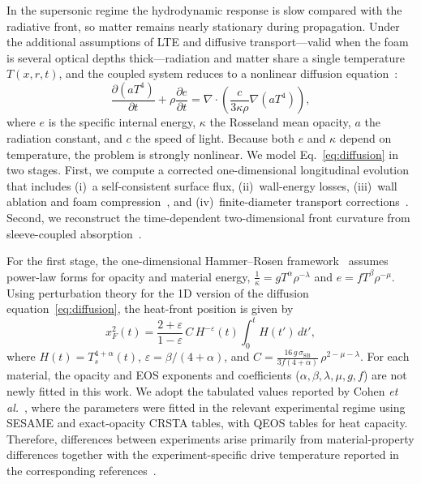 \documentclass[prl, twocolumn, superscriptaddress, amsmath, amssymb, reprint]{revtex4-2}
\begin{document}
In the supersonic regime the hydrodynamic response is slow compared with the radiative front, so matter remains nearly stationary during propagation. Under the additional assumptions of LTE and diffusive transport---valid when the foam is several optical depths thick---radiation and matter share a single temperature $T(x,r,t)$, and the coupled system reduces to a nonlinear diffusion equation~\cite{Pomraning1979,Rosen2009}:
\begin{equation}\label{eq:diffusion}
\frac{\partial (aT^4)}{\partial t} + \rho\frac{\partial e}{\partial t}
= \nabla\!\cdot\!\left(\frac{c}{3\kappa \rho}\nabla\left(aT^4\right)\right),
\end{equation}
where $e$ is the specific internal energy, $\kappa$ the Rosseland mean opacity, $a$ the radiation constant, and $c$ the speed of light. Because both $e$ and $\kappa$ depend on temperature, the problem is strongly nonlinear. We model Eq.~\eqref{eq:diffusion} in two stages. First, we compute a corrected one-dimensional longitudinal evolution that includes (i)~a self-consistent surface flux, (ii)~wall-energy losses, (iii)~wall ablation and foam compression~\cite{Cohen2020Key,Cohen2018}, and (iv)~finite-diameter transport corrections~\cite{Courtois2024}. Second, we reconstruct the time-dependent two-dimensional front curvature from sleeve-coupled absorption~\cite{Hurricane2006,Courtois2022}.

For the first stage, the one-dimensional Hammer--Rosen framework~\cite{Hammer2003,Rosen2009} assumes power-law forms for opacity and material energy,
$\frac{1}{\kappa}=gT^{\alpha}\rho^{-\lambda}$ and $e=fT^{\beta}\rho^{-\mu}$. Using perturbation theory for the 1D version of the diffusion equation~\eqref{eq:diffusion}, the heat-front position is given by
\begin{equation}\label{eq:HR}
    x_F^2(t) = \frac{2+\varepsilon}{1-\varepsilon}\,C\,H^{-\varepsilon}(t)\int_0^t H(t')\,dt',
\end{equation}
where $H(t) = T_s^{4+\alpha}(t)$, $\varepsilon = \beta/(4+\alpha)$, and
	$C = \frac{16\,g\,\sigma_{\mathrm{SB}}}{3f(4+\alpha)}\,\rho^{2-\mu-\lambda}$.
For each material, the opacity and EOS exponents and coefficients ($\alpha,\beta,\lambda,\mu,g,f$) are not newly fitted in this work. We adopt the tabulated values reported by Cohen \textit{et al.}~\cite{Cohen2020Key}, where the parameters were fitted in the relevant experimental regime using SESAME and exact-opacity CRSTA tables, with QEOS tables for heat capacity. Therefore, differences between experiments arise primarily from material-property differences together with the experiment-specific drive temperature reported in the corresponding references~\cite{Back2000PRL,Back2000POP,Moore2015,Courtois2024}.
\end{document}
